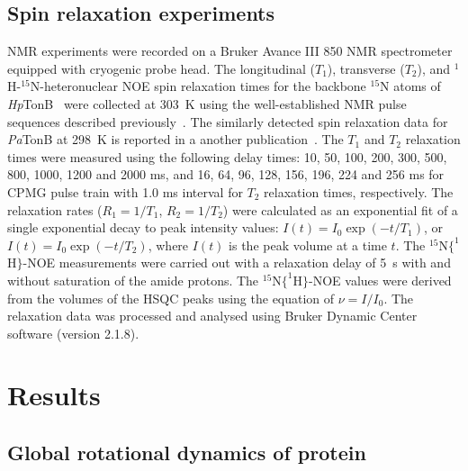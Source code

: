 \documentclass[pre,aps,floatfix,authordate1-4,twocolumn]{revtex4-1}
\begin{document}
\subsection{Spin relaxation experiments}
NMR experiments were recorded on a Bruker Avance III 850 NMR spectrometer equipped
with cryogenic probe head. The longitudinal ($T_1$), transverse ($T_2$), and
$^1$H-$^{15}$N-heteronuclear NOE spin relaxation times
for the backbone $^{15}$N atoms of {\it Hp}TonB~\cite{ciragan16}
were collected at 303~K using the well-established NMR pulse sequences described previously~\cite{kay89,barbato92}.
The similarly detected spin relaxation data for {\it Pa}TonB at 298~K is reported in a another publication~\cite{??}. 
The $T_1$ and $T_2$ relaxation times were measured using the following delay
times: 10, 50, 100, 200, 300, 500, 800, 1000, 1200 and 2000 ms,
and 16, 64, 96, 128, 156, 196, 224 and 256 ms for CPMG pulse train with 1.0 ms interval
for $T_2$ relaxation times, respectively. The relaxation rates ($R_1=1/T_1$, $R_2=1/T_2$)
were calculated as an exponential fit of a single exponential decay to peak intensity
values: $I(t) = I_0 \exp(-t/T_1)$, or $I(t)=I_0 \exp(-t/T_2)$,
where $I(t)$ is the peak volume at a time $t$. The $^{15}$N$ \{ ^1$H$ \} $-NOE measurements were carried out
with a relaxation delay of 5~s with and without saturation of the amide protons.
The $^{15}$N$ \{ ^1$H$ \} $-NOE values were derived from the volumes of the HSQC peaks using the
equation of $\nu=I/I_0$. The relaxation data was processed and analysed using
Bruker Dynamic Center software (version 2.1.8).

\section{Results}

\subsection{Global rotational dynamics of protein}
\end{document}
